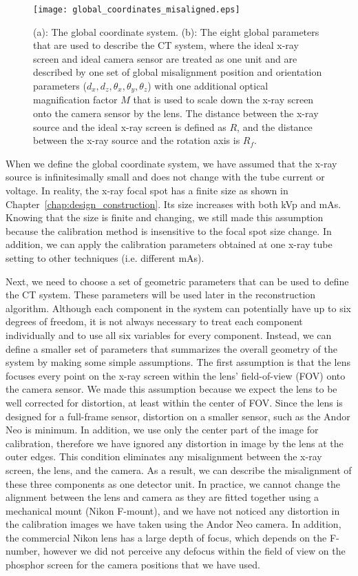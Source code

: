 \begin{figure}[ht]
\centering
\texttt{[image: global\_coordinates\_misaligned.eps]}
\caption{ (a): The global coordinate system.  (b): The eight global parameters that are used to describe the CT system, where the ideal x-ray screen and ideal camera sensor are treated as one unit and are described by one set of global misalignment position and orientation parameters ($d_x, d_z, \theta_x, \theta_y, \theta_z$) with one additional optical magnification factor $M$ that is used to scale down the x-ray screen onto the camera sensor by the lens.  The distance between the x-ray source and the ideal x-ray screen is defined as $R$, and the distance between the x-ray source and the rotation axis is $R_f$.}
\label{fig:global_coord_misaligned}
\end{figure}

When we define the global coordinate system, we have assumed that the x-ray source is infinitesimally small and does not change with the tube current or voltage.  In reality, the x-ray focal spot has a finite size as shown in Chapter~\ref{chap:design_construction}.  Its size increases with both kVp and mAs.  Knowing that the size is finite and changing, we still made this assumption because the calibration method is insensitive to the focal spot size change.  In addition, we can apply the calibration parameters obtained at one x-ray tube setting to other techniques (i.e. different mAs). 

Next, we need to choose a set of geometric parameters that can be used to define the CT system.  These parameters will be used later in the reconstruction algorithm.  Although each component in the system can potentially have up to six degrees of freedom, it is not always necessary to treat each component individually and to use all six variables for every component.  Instead, we can define a smaller set of parameters that summarizes the overall geometry of the system by making some simple assumptions.  The first assumption is that the lens focuses every point on the x-ray screen within the lens' field-of-view (FOV) onto the camera sensor.  We made this assumption because we expect the lens to be well corrected for distortion, at least within the center of FOV.  Since the lens is designed for a full-frame sensor, distortion on a smaller sensor, such as the Andor Neo is minimum.  In addition, we use only the center part of the image for calibration, therefore we have ignored any distortion in image by the lens at the outer edges.  This condition eliminates any misalignment between the x-ray screen, the lens, and the camera.  As a result, we can describe the misalignment of these three components as one detector unit.  In practice, we cannot change the alignment between the lens and camera as they are fitted together using a mechanical mount (Nikon F-mount), and we have not noticed any distortion in the calibration images we have taken using the Andor Neo camera.  In addition, the commercial Nikon lens has a large depth of focus, which depends on the F-number, however we did not perceive any defocus within the field of view on the phosphor screen for the camera positions that we have used.


